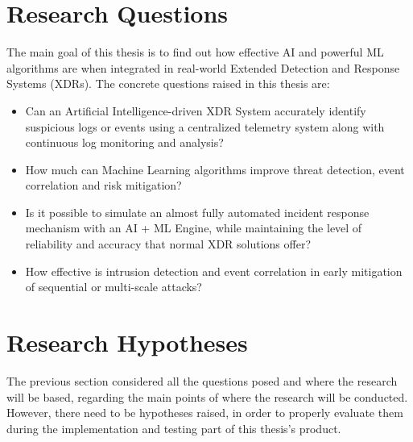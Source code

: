 \documentclass[12pt,a4paper]{report}
\begin{document}
\section{Research Questions}

The main goal of this thesis is to find out how effective AI and powerful ML algorithms are when
integrated in real-world Extended Detection and Response Systems (XDRs). The concrete questions
raised in this thesis are:

\begin{itemize}
  \item[\textbf{RQ1:}] Can an Artificial Intelligence-driven XDR System accurately identify
  suspicious logs or events using a centralized telemetry system along with continuous log
  monitoring and analysis?

  \item[\textbf{RQ2:}] How much can Machine Learning algorithms improve threat detection, event
  correlation and risk mitigation?

  \item[\textbf{RQ3:}] Is it possible to simulate an almost fully automated incident response
  mechanism with an AI + ML Engine, while maintaining the level of reliability and accuracy that
  normal XDR solutions offer?

  \item[\textbf{RQ4:}] How effective is intrusion detection and event correlation in early
  mitigation of sequential or multi-scale attacks?
\end{itemize}

\section{Research Hypotheses}

The previous section considered all the questions posed and where the research will be based,
regarding the main points of where the research will be conducted. However, there need to be
hypotheses raised, in order to properly evaluate them during the implementation and testing part
of this thesis's product.
\end{document}
